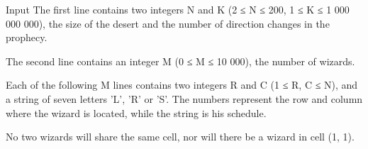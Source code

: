 Input
The first line contains two integers N and K (2 ≤ N ≤ 200, 1 ≤ K ≤ 1 000 000 000), the size of the desert and the number of direction changes in the prophecy.  

   The second line contains an integer M (0 ≤ M ≤ 10 000), the number of wizards.  

   Each of the following M lines contains two integers R and C (1 ≤ R, C ≤ N), and a string of seven letters 'L', 'R' or 'S'. The numbers represent the row and column where the wizard is located, while the string is his schedule.  

   No two wizards will share the same cell, nor will there be a wizard in cell (1, 1).